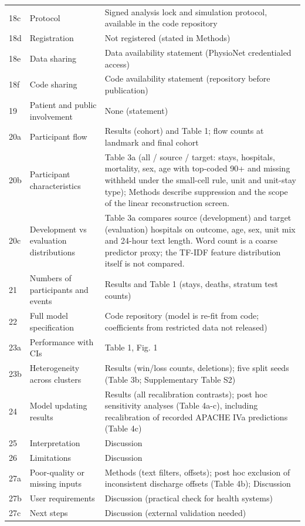 \documentclass[10pt]{article}
\begin{document}
\begin{longtable}{@{}p{}p{}p{}@{}}
18c & Protocol & Signed analysis lock and simulation protocol, available in the code repository \\
18d & Registration & Not registered (stated in Methods) \\
18e & Data sharing & Data availability statement (PhysioNet credentialed access) \\
18f & Code sharing & Code availability statement (repository before publication) \\
19 & Patient and public involvement & None (statement) \\
20a & Participant flow & Results (cohort) and Table 1; flow counts at landmark and final cohort \\
20b & Participant characteristics & Table 3a (all / source / target: stays, hospitals, mortality, sex, age with top-coded 90+ and missing withheld under the small-cell rule, unit and unit-stay type); Methods describe suppression and the scope of the linear reconstruction screen. \\
20c & Development vs evaluation distributions & Table 3a compares source (development) and target (evaluation) hospitals on outcome, age, sex, unit mix and 24-hour text length. Word count is a coarse predictor proxy; the TF-IDF feature distribution itself is not compared. \\
21 & Numbers of participants and events & Results and Table 1 (stays, deaths, stratum test counts) \\
22 & Full model specification & Code repository (model is re-fit from code; coefficients from restricted data not released) \\
23a & Performance with CIs & Table 1, Fig. 1 \\
23b & Heterogeneity across clusters & Results (win/loss counts, deletions); five split seeds (Table 3b; Supplementary Table S2) \\
24 & Model updating results & Results (all recalibration contrasts); post hoc sensitivity analyses (Table 4a-c), including recalibration of recorded APACHE IVa predictions (Table 4c) \\
25 & Interpretation & Discussion \\
26 & Limitations & Discussion \\
27a & Poor-quality or missing inputs & Methods (text filters, offsets); post hoc exclusion of inconsistent discharge offsets (Table 4b); Discussion \\
27b & User requirements & Discussion (practical check for health systems) \\
27c & Next steps & Discussion (external validation needed) \\
\bottomrule
\end{longtable}
\end{document}
